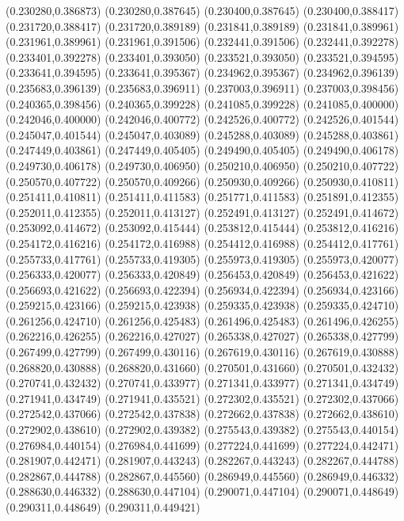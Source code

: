 (0.230280,0.386873)
(0.230280,0.387645)
(0.230400,0.387645)
(0.230400,0.388417)
(0.231720,0.388417)
(0.231720,0.389189)
(0.231841,0.389189)
(0.231841,0.389961)
(0.231961,0.389961)
(0.231961,0.391506)
(0.232441,0.391506)
(0.232441,0.392278)
(0.233401,0.392278)
(0.233401,0.393050)
(0.233521,0.393050)
(0.233521,0.394595)
(0.233641,0.394595)
(0.233641,0.395367)
(0.234962,0.395367)
(0.234962,0.396139)
(0.235683,0.396139)
(0.235683,0.396911)
(0.237003,0.396911)
(0.237003,0.398456)
(0.240365,0.398456)
(0.240365,0.399228)
(0.241085,0.399228)
(0.241085,0.400000)
(0.242046,0.400000)
(0.242046,0.400772)
(0.242526,0.400772)
(0.242526,0.401544)
(0.245047,0.401544)
(0.245047,0.403089)
(0.245288,0.403089)
(0.245288,0.403861)
(0.247449,0.403861)
(0.247449,0.405405)
(0.249490,0.405405)
(0.249490,0.406178)
(0.249730,0.406178)
(0.249730,0.406950)
(0.250210,0.406950)
(0.250210,0.407722)
(0.250570,0.407722)
(0.250570,0.409266)
(0.250930,0.409266)
(0.250930,0.410811)
(0.251411,0.410811)
(0.251411,0.411583)
(0.251771,0.411583)
(0.251891,0.412355)
(0.252011,0.412355)
(0.252011,0.413127)
(0.252491,0.413127)
(0.252491,0.414672)
(0.253092,0.414672)
(0.253092,0.415444)
(0.253812,0.415444)
(0.253812,0.416216)
(0.254172,0.416216)
(0.254172,0.416988)
(0.254412,0.416988)
(0.254412,0.417761)
(0.255733,0.417761)
(0.255733,0.419305)
(0.255973,0.419305)
(0.255973,0.420077)
(0.256333,0.420077)
(0.256333,0.420849)
(0.256453,0.420849)
(0.256453,0.421622)
(0.256693,0.421622)
(0.256693,0.422394)
(0.256934,0.422394)
(0.256934,0.423166)
(0.259215,0.423166)
(0.259215,0.423938)
(0.259335,0.423938)
(0.259335,0.424710)
(0.261256,0.424710)
(0.261256,0.425483)
(0.261496,0.425483)
(0.261496,0.426255)
(0.262216,0.426255)
(0.262216,0.427027)
(0.265338,0.427027)
(0.265338,0.427799)
(0.267499,0.427799)
(0.267499,0.430116)
(0.267619,0.430116)
(0.267619,0.430888)
(0.268820,0.430888)
(0.268820,0.431660)
(0.270501,0.431660)
(0.270501,0.432432)
(0.270741,0.432432)
(0.270741,0.433977)
(0.271341,0.433977)
(0.271341,0.434749)
(0.271941,0.434749)
(0.271941,0.435521)
(0.272302,0.435521)
(0.272302,0.437066)
(0.272542,0.437066)
(0.272542,0.437838)
(0.272662,0.437838)
(0.272662,0.438610)
(0.272902,0.438610)
(0.272902,0.439382)
(0.275543,0.439382)
(0.275543,0.440154)
(0.276984,0.440154)
(0.276984,0.441699)
(0.277224,0.441699)
(0.277224,0.442471)
(0.281907,0.442471)
(0.281907,0.443243)
(0.282267,0.443243)
(0.282267,0.444788)
(0.282867,0.444788)
(0.282867,0.445560)
(0.286949,0.445560)
(0.286949,0.446332)
(0.288630,0.446332)
(0.288630,0.447104)
(0.290071,0.447104)
(0.290071,0.448649)
(0.290311,0.448649)
(0.290311,0.449421)
